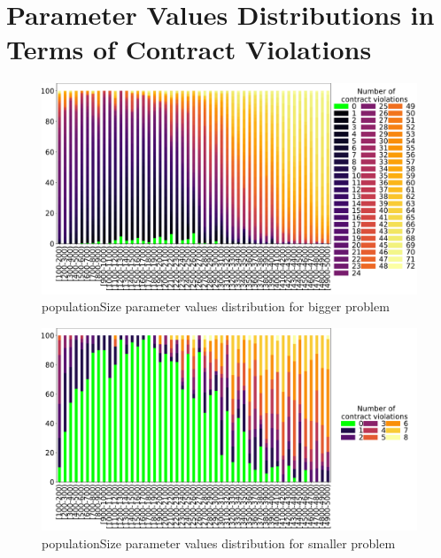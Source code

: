 \chapter{Parameter Values Distributions in Terms of Contract Violations}\label{appendix:Distributions2}
\begin{figure}
	\centering
	\includegraphics[width=\textwidth]{images/DistrValidityBig/populationSize.pdf}
	\caption[populationSize parameter values distribution for bigger problem]{populationSize parameter values distribution for bigger problem}  
	\label{fig:populationSize_DistBig}
\end{figure}
\begin{figure}
	\centering
	\includegraphics[width=\textwidth]{images/DistrValiditySmall/populationSize.pdf}
	\caption[populationSize parameter values distribution for smaller problem]{populationSize parameter values distribution for smaller problem}
	\label{fig:populationSize_DistSmall}
\end{figure}

